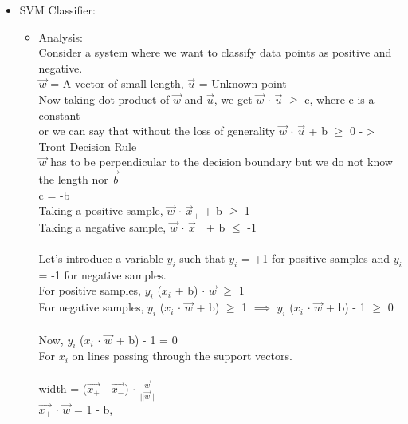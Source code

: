 \documentclass{article}
\begin{document}
\begin{itemize}
    \item SVM Classifier: 
    \begin{itemize}
        \item Analysis: 
        \\Consider a system where we want to classify data points as positive and negative.
        \\$\Vec{w}$ = A vector of small length, \hspace{3mm}
        $\Vec{u}$ = Unknown point
        \\Now taking dot product of $\Vec{w}$ and $\Vec{u}$, we get $\Vec{w}$ $\cdot$ $\Vec{u}$ $\geq$ c, where c is a constant
        \\or we can say that without the loss of generality $\Vec{w}$ $\cdot$ $\Vec{u}$ + b $\geq$ 0  -$>$ Tront Decision Rule
        \\$\Vec{w}$ has to be perpendicular to the decision boundary but we do not know the length nor $\Vec{b}$
        \\c = -b
        \\Taking a positive sample, \hspace{3mm}
        $\Vec{w}$ $\cdot$ $\Vec{x}_{+}$ + b $\geq$ 1
        \\Taking a negative sample, \hspace{3mm}
        $\Vec{w}$ $\cdot$ $\Vec{x}_{-}$ + b $\leq$ -1
        \\ \\Let's introduce a variable $y_{i}$ such that $y_{i}$ = +1 for positive samples and $y_{i}$ = -1 for negative samples.
        \\For positive samples, \hspace{3mm}
        $y_{i}$ ($x_{i}$ + b) $\cdot$ $\Vec{w}$ $\geq$ 1
        \\For negative samples, \hspace{3mm}
        $y_{i}$ ($x_{i}$ $\cdot$ $\Vec{w}$ + b)  $\geq$ 1 $\implies$
        $y_{i}$ ($x_{i}$ $\cdot$ $\Vec{w}$ + b) - 1 $\geq$ 0
        \\ \\Now, $y_{i}$ ($x_{i}$ $\cdot$ $\Vec{w}$ + b) - 1 = 0
        \\For $x_{i}$ on lines passing through the support vectors.
        \\ \\width = ($\Vec{x_{+}}$ - $\Vec{x_{-}}$) $\cdot$ $\frac{\Vec{w}}{||\Vec{w}||}$
        \\$\Vec{x_{+}}$ $\cdot$ $\Vec{w}$ = 1 - b, \hspace{3mm}

\end{itemize}
\end{itemize}
\end{document}
